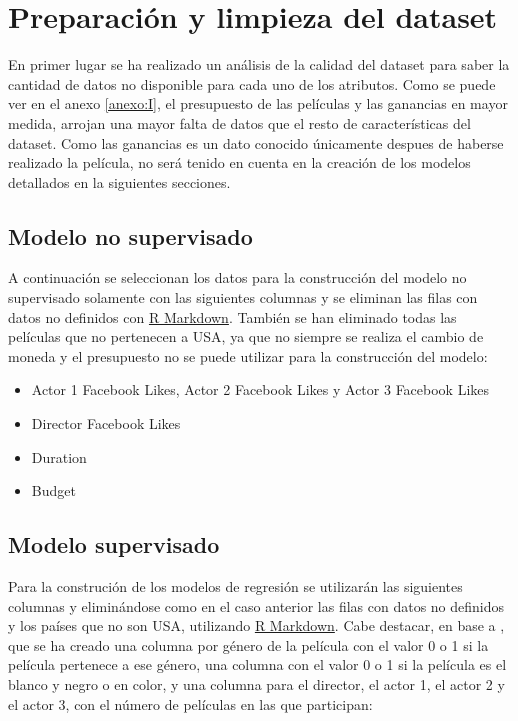 \documentclass{article}
\begin{document}
\clearpage

\section{Preparación y limpieza del dataset}

En primer lugar se ha realizado un análisis de la calidad del dataset para saber la cantidad de datos no disponible para cada uno de los atributos. Como se puede ver en el anexo \ref{anexo:I}, el presupuesto de las películas y las ganancias en mayor medida, arrojan una mayor falta de datos que el resto de características del dataset. Como las ganancias es un dato conocido únicamente despues de haberse realizado la película, no será tenido en cuenta en la creación de los modelos detallados en la siguientes secciones. 

\subsection{Modelo no supervisado}

A continuación se seleccionan los datos para la construcción del modelo no supervisado solamente con las siguientes columnas y se eliminan las filas con datos no definidos con \href{https://github.com/pozueco/proyecto_fin_de_master/blob/master/clean_dataset.md}{R Markdown}. También se han eliminado todas las películas que no pertenecen a USA, ya que no siempre se realiza el cambio de moneda y el presupuesto no se puede utilizar para la construcción del modelo:

\begin{itemize}
  \item Actor 1 Facebook Likes, Actor 2 Facebook Likes y Actor 3 Facebook Likes 
  \item Director Facebook Likes
  \item Duration
  \item Budget
\end{itemize}

\subsection{Modelo supervisado}

Para la construción de los modelos de regresión se utilizarán las siguientes columnas y eliminándose como en el caso anterior las filas con datos no definidos y los países que no son USA, utilizando \href{https://github.com/pozueco/proyecto_fin_de_master/blob/master/clean_dataset.md}{R Markdown}. Cabe destacar, en base a \cite{cleansing}, que se ha creado una columna por género de la película con el valor 0 o 1 si la película pertenece a ese género, una columna con el valor 0 o 1 si la película es el blanco y negro o en color, y una columna para el director, el actor 1, el actor 2 y el actor 3, con el número de películas en las que participan:
\end{document}
